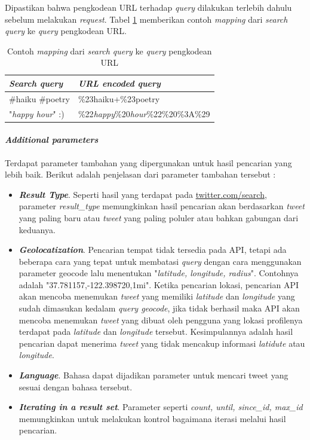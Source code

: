 Dipastikan bahwa pengkodean URL terhadap \textit{query} dilakukan terlebih dahulu sebelum melakukan \textit{request}. Tabel \ref{tab:ContohMappingDariSeachQuery} memberikan contoh \textit{mapping} dari \textit{search query} ke \textit{query} pengkodean URL.

\begin{table}[h]
\begin{tabular}{|l|l|}
\hline
\textbf{\textit{Search query}}     & \textbf{\textit{URL encoded query}}                 \\ \hline
\#haiku \#poetry & \%23haiku+\%23poetry              \\
"\textit{happy hour}" :)  & \%22\textit{happy}\%20\textit{hour}\%22\%20\%3A\%29 \\ \hline
\end{tabular}
\caption{Contoh \textit{mapping} dari \textit{search query} ke \textit{query} pengkodean URL}
\label{tab:ContohMappingDariSeachQuery}
\end{table}

\paragraph{\textit{Additional parameters}}
Terdapat parameter tambahan yang dipergunakan untuk hasil pencarian yang lebih baik. Berikut adalah penjelasan dari parameter tambahan tersebut :

\begin{itemize}
	\item \textbf{\textit{Result Type}}. Seperti hasil yang terdapat pada \url{twitter.com/search}, parameter \textit{result\_type} memungkinkan hasil pencarian akan berdasarkan \textit{tweet} yang paling baru atau \textit{tweet} yang paling poluler atau bahkan gabungan dari keduanya.
	\item \textit{\textbf{Geolocatization}}. Pencarian tempat tidak tersedia pada API, tetapi ada beberapa cara yang tepat untuk membatasi \textit{query} dengan cara menggunakan parameter geocode lalu menentukan "\textit{latitude, longitude, radius}". Contohnya adalah "37.781157,-122.398720,1mi". Ketika pencarian lokasi, pencarian API akan mencoba menemukan \textit{tweet} yang memiliki \textit{latitude} dan \textit{longitude} yang sudah dimasukan kedalam \textit{query geocode}, jika tidak berhasil maka API akan mencoba menemukan \textit{tweet} yang dibuat oleh pengguna yang lokasi profilenya terdapat pada \textit{latitude} dan \textit{longitude} tersebut. Kesimpulannya adalah hasil pencarian dapat menerima \textit{tweet} yang tidak mencakup informasi \textit{latidute} atau \textit{longitude}.
	\item \textit{\textbf{Language}}. Bahasa dapat dijadikan parameter untuk mencari tweet yang sesuai dengan bahasa tersebut.
	\item \textbf{\textit{Iterating in a result set}}. Parameter seperti \textit{count, until, since\_id, max\_id} memungkinkan untuk melakukan kontrol bagaimana iterasi melalui hasil pencarian.
\end{itemize}

